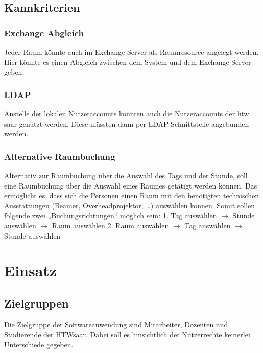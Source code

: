 \documentclass[a4paper,12pt]{article}
\begin{document}
\subsection{Kannkriterien}
\subsubsection{Exchange Abgleich}
Jeder Raum könnte auch im Exchange Server als Raumresource angelegt werden. Hier könnte es einen Abgleich zwischen dem System und dem Exchange-Server geben.

\subsubsection{LDAP}
Anstelle der lokalen Nutzeraccounts könnten auch die Nutzeraccounts der htw saar genutzt werden. Diese müssten dann per LDAP Schnittstelle angebunden werden.

\subsubsection{Alternative Raumbuchung}
Alternativ zur Raumbuchung über die Auswahl des Tags und der Stunde, soll eine Raumbuchung über die Auswahl eines Raumes getätigt werden können. Das ermöglicht es, dass sich die Personen einen Raum mit den benötigten technischen Ausstattungen (Beamer, Overheadprojektor, …) auswählen können.
Somit sollen folgende zwei „Buchungsrichtungen“ möglich sein:
1.	Tag auswählen $\rightarrow$ Stunde auswählen $\rightarrow$ Raum auswählen
2.	Raum auswählen $\rightarrow$ Tag auswählen $\rightarrow$ Stunde auswählen


\section{Einsatz}
\subsection{Zielgruppen}
Die Zielgruppe der Softwareanwendung sind Mitarbeiter, Dozenten und Studierende der HTWsaar. Dabei soll es hinsichtlich der Nutzerrechte keinerlei Unterschiede gegeben.
\end{document}
